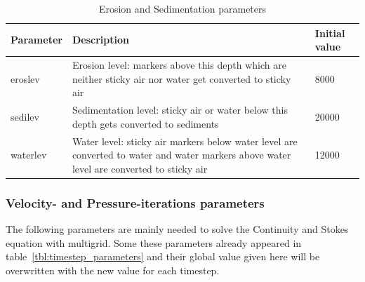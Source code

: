 \begin{table}[H]
\begin{table}[H]
\small
\centering
\begin{tabular}{l p{10cm} l}
\toprule
Parameter & Description & Initial value \\
\midrule
eroslev 	& Erosion level: markers above this depth which are neither sticky air nor water get converted to sticky air & 8000\\
sedilev 	& Sedimentation level: sticky air or water below this depth gets converted to sediments & 20000\\
waterlev 	& Water level: sticky air markers below water level are converted to water and water markers above water level are converted to sticky air & 12000\\
\bottomrule
\end{tabular}
\caption{Erosion and Sedimentation parameters}
\label{tbl:mode_sed_parameters}
\end{table}

\subsubsection{Velocity- and Pressure-iterations parameters}
The following parameters are mainly needed to solve the Continuity and Stokes equation with multigrid. Some these parameters already appeared in table~\ref{tbl:timestep_parameters} and their global value given here will be overwritten with the new value for each timestep. 


\end{table}
